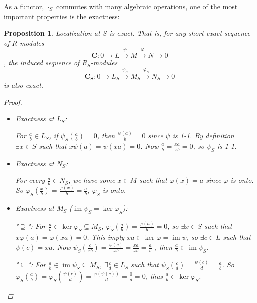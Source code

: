\documentclass[a4paper]{article}
\DeclareMathOperator{\im}{im}
\newcommand*\xto[1]{\xrightarrow{#1}}
\theoremstyle{mystyle}
\newtheorem{prop}{Proposition}
\begin{document}
As a functor, $\cdot_S$ commutes with many algebraic operations, one of the most
important properties is the exactness:
\begin{prop}
  Localization at $S$ is exact. That is, for any short exact sequence of $R$-modules
  \[
    \mathbf{C} : 0 \to L \xto{\psi} M \xto{\varphi} N \to 0
  \], the induced sequence of $R_S$-modules
  \[
    \mathbf{C_S} : 0 \to L_S \xto{\psi_S} M_S \xto{\varphi_S} N_S \to 0
  \] is also exact.

  \begin{proof}
    $ $
    \begin{itemize}
      \item Exactness at $L_S$:

        For $\frac{a}{b} \in L_S$, if $\psi_S(\frac{a}{b}) = 0$, then
        $\frac{\psi(a)}{b} = 0$ since $\psi$ is 1-1. 
        By definition $\exists x \in S$ such that
        $x \psi(a) = \psi(xa) = 0$.
        Now $\frac{a}{b} = \frac{xa}{xb} = 0$, so $\psi_S$ is 1-1.

      \item Exactness at $N_S$:

        For every $\frac{a}{b} \in N_S$, we have some $x \in M$ such that 
        $\varphi(x) = a$ since $\varphi$ is onto. So 
        $\varphi_S(\frac{x}{b}) = \frac{\varphi(x)}{b} = \frac{a}{b}$, 
        $\varphi_S$ is onto.

      \item Exactness at $M_S$ ($\im \psi_S = \ker \varphi_S$):

        "$\supseteq$": 
        For $\frac{a}{b} \in \ker \varphi_S \subseteq M_S$, 
        $\varphi_S(\frac{a}{b}) = \frac{\varphi(a)}{b} = 0$, so 
        $\exists x \in S$ such that $x \varphi(a) = \varphi(xa) = 0$.
        This imply $xa \in \ker \varphi = \im \psi$, so $\exists c \in L$ such 
        that $\psi(c) = xa$. 
        Now $\psi_S(\frac{c}{xb}) = \frac{\psi(c)}{xb} = \frac{xa}{xb} = \frac{a}{b}$
        , then $\frac{a}{b} \in \im \psi_S$. 

        "$\subseteq$":
        For $\frac{a}{b} \in \im \psi_S \subseteq M_S$, 
        $\exists \frac{c}{d} \in L_S$ such that $\psi_S(\frac{c}{d}) = 
        \frac{\psi(c)}{d} = \frac{a}{b}$. 
        So $\varphi_S(\frac{a}{b}) = \varphi_S(\frac{\psi(c)}{d}) 
        = \frac{\varphi(\psi(c))}{d} = \frac{0}{d} = 0$, thus
        $\frac{a}{b} \in \ker \varphi_S$.
    \end{itemize}
  \end{proof}
\end{prop}
\end{document}
